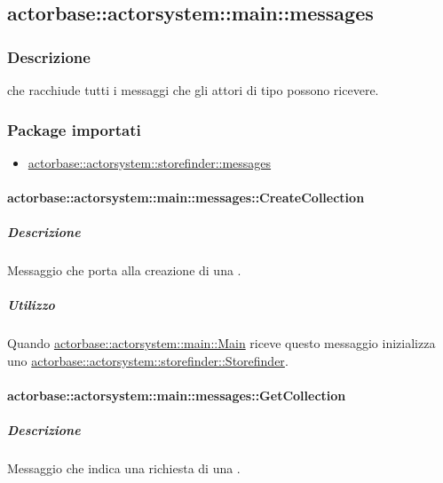 \documentclass{scalatekids-article}
\begin{document}
\subsection{actorbase::actorsystem::main::messages}
\label{sec:actorbase::actorsystem::main::messages}

\subsubsection{Descrizione}

 che racchiude tutti i messaggi che gli attori di tipo
 possono ricevere.

\subsubsection{Package importati}

\begin{itemize}
\item \hyperref[sec:actorbase::actorsystem::storefinder::messages]{actorbase::actorsystem::storefinder::messages}
\end{itemize}

\paragraph{actorbase::actorsystem::main::messages::CreateCollection}
\label{sec:actorbase::actorsystem::main::messages::CreateCollection}

\subparagraph{Descrizione}

Messaggio che porta alla creazione di una .

\subparagraph{Utilizzo}

Quando \hyperref[sec:actorbase::actorsystem::main::Main]{actorbase::actorsystem::main::Main}
riceve questo messaggio inizializza uno \hyperref[sec:actorbase::actorsystem::storefinder::Storefinder]{actorbase::actorsystem::\allowbreak{}storefinder::\allowbreak{}Storefinder}.

\paragraph{actorbase::actorsystem::main::messages::GetCollection}
\label{sec:actorbase::actorsystem::main::messages::GetCollection}

\subparagraph{Descrizione}

Messaggio che indica una richiesta di una .
\end{document}
